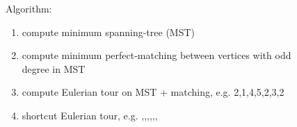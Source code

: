 \documentclass{beamer} %
\begin{document}
\begin{frame}
\begin{columns}[T]
\begin{column}{.35\textwidth}
\begin{figure}
\begin{overprint}
          \begin{center}\end{center}
          \begin{center}\end{center}
          \begin{center}\end{center}
        \end{overprint}
      \end{figure}
    \end{column}%
    \hfill%
    \begin{column}{.65\textwidth}
      \begin{minipage}[c][.6\textheight][c]{\linewidth}
        Algorithm:
        \begin{enumerate}
          \item<2-> compute { minimum spanning-tree} (MST) %
          \item<3-> compute { minimum perfect-matching} between vertices with odd degree in MST
          \item<4-> compute Eulerian tour on MST + matching, e.g. 2,1,4,5,2,3,2
          \item<5-> shortcut Eulerian tour, e.g. ,,,,,,
        \end{enumerate}
      \end{minipage}
    \end{column}%
  \end{columns}

\end{frame}
\end{document}
